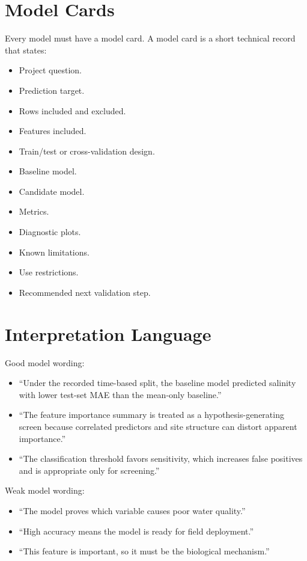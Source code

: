 \section{Model Cards}

Every model must have a model card. A model card is a short technical record that states:
\begin{itemize}
  \item Project question.
  \item Prediction target.
  \item Rows included and excluded.
  \item Features included.
  \item Train/test or cross-validation design.
  \item Baseline model.
  \item Candidate model.
  \item Metrics.
  \item Diagnostic plots.
  \item Known limitations.
  \item Use restrictions.
  \item Recommended next validation step.
\end{itemize}

\section{Interpretation Language}

Good model wording:
\begin{itemize}
  \item ``Under the recorded time-based split, the baseline model predicted salinity with lower test-set MAE than the mean-only baseline.''
  \item ``The feature importance summary is treated as a hypothesis-generating screen because correlated predictors and site structure can distort apparent importance.''
  \item ``The classification threshold favors sensitivity, which increases false positives and is appropriate only for screening.''
\end{itemize}

Weak model wording:
\begin{itemize}
  \item ``The model proves which variable causes poor water quality.''
  \item ``High accuracy means the model is ready for field deployment.''
  \item ``This feature is important, so it must be the biological mechanism.''
\end{itemize}

